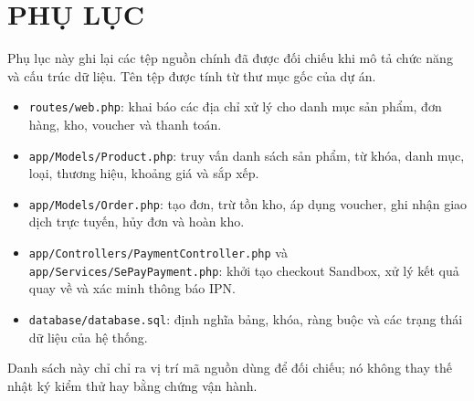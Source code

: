 \chapter*{PHỤ LỤC}\label{phuluc_intro}
\vspace{-40pt}
Phụ lục này ghi lại các tệp nguồn chính đã được đối chiếu khi mô tả chức năng và cấu trúc dữ liệu. Tên tệp được tính từ thư mục gốc của dự án.

\begin{itemize}
    \item \texttt{routes/web.php}: khai báo các địa chỉ xử lý cho danh mục sản phẩm, đơn hàng, kho, voucher và thanh toán.
    \item \texttt{app/Models/Product.php}: truy vấn danh sách sản phẩm, từ khóa, danh mục, loại, thương hiệu, khoảng giá và sắp xếp.
    \item \texttt{app/Models/Order.php}: tạo đơn, trừ tồn kho, áp dụng voucher, ghi nhận giao dịch trực tuyến, hủy đơn và hoàn kho.
    \item \texttt{app/Controllers/PaymentController.php} và \texttt{app/Services/SePayPayment.php}: khởi tạo checkout Sandbox, xử lý kết quả quay về và xác minh thông báo IPN.
    \item \texttt{database/database.sql}: định nghĩa bảng, khóa, ràng buộc và các trạng thái dữ liệu của hệ thống.
\end{itemize}

Danh sách này chỉ chỉ ra vị trí mã nguồn dùng để đối chiếu; nó không thay thế nhật ký kiểm thử hay bằng chứng vận hành.
